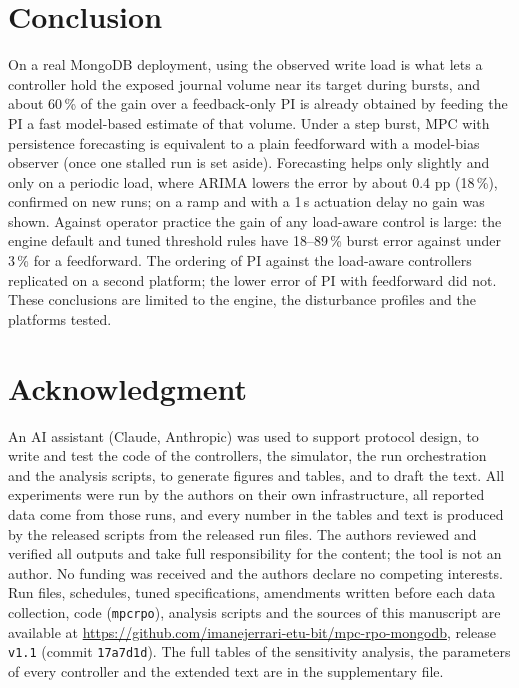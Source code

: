 \documentclass[journal]{IEEEtran}
\newcommand{\repoRef}{ (commit \texttt{17a7d1d})}
\begin{document}
\section{Conclusion}\label{sec:conclusion}
On a real MongoDB deployment, using the observed write load is what lets a controller hold the exposed journal volume near its target during bursts, and about 60\,\% of the gain over a feedback-only PI is already obtained by feeding the PI a fast model-based estimate of that volume. Under a step burst, MPC with persistence forecasting is equivalent to a plain feedforward with a model-bias observer (once one stalled run is set aside). Forecasting helps only slightly and only on a periodic load, where ARIMA lowers the error by about 0.4 pp (18\,\%), confirmed on new runs; on a ramp and with a 1\,s actuation delay no gain was shown. Against operator practice the gain of any load-aware control is large: the engine default and tuned threshold rules have 18--89\,\% burst error against under 3\,\% for a feedforward. The ordering of PI against the load-aware controllers replicated on a second platform; the lower error of PI with feedforward did not. These conclusions are limited to the engine, the disturbance profiles and the platforms tested.

\section*{Acknowledgment}
An AI assistant (Claude, Anthropic) was used to support protocol design, to write and test the code of the controllers, the simulator, the run orchestration and the analysis scripts, to generate figures and tables, and to draft the text. All experiments were run by the authors on their own infrastructure, all reported data come from those runs, and every number in the tables and text is produced by the released scripts from the released run files. The authors reviewed and verified all outputs and take full responsibility for the content; the tool is not an author. No funding was received and the authors declare no competing interests. Run files, schedules, tuned specifications, amendments written before each data collection, code (\texttt{mpcrpo}), analysis scripts and the sources of this manuscript are available at \url{https://github.com/imanejerrari-etu-bit/mpc-rpo-mongodb}, release \texttt{v1.1}\repoRef. The full tables of the sensitivity analysis, the parameters of every controller and the extended text are in the supplementary file.
\end{document}
